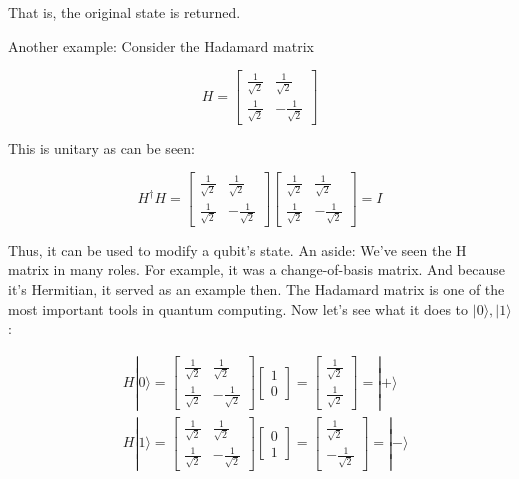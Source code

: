\documentclass[main.tex]{subfiles}
\begin{document}
    That is, the original state is returned.
    
    Another example: Consider the Hadamard matrix
    
    $$
    H=\left[\begin{array}{cc}
    \frac{1}{\sqrt{2}} & \frac{1}{\sqrt{2}} \\
    \frac{1}{\sqrt{2}} & -\frac{1}{\sqrt{2}}
    \end{array}\right]
    $$
    
    This is unitary as can be seen:
    
    $$
    H^{\dagger} H=\left[\begin{array}{cc}
    \frac{1}{\sqrt{2}} & \frac{1}{\sqrt{2}} \\
    \frac{1}{\sqrt{2}} & -\frac{1}{\sqrt{2}}
    \end{array}\right]\left[\begin{array}{cc}
    \frac{1}{\sqrt{2}} & \frac{1}{\sqrt{2}} \\
    \frac{1}{\sqrt{2}} & -\frac{1}{\sqrt{2}}
    \end{array}\right]=I
    $$
    
    Thus, it can be used to modify a qubit's state. An aside: We've seen the H matrix in many roles. For example, it was a change-of-basis matrix. And because it's Hermitian, it served as an example then. The Hadamard matrix is one of the most important tools in quantum computing. Now let's see what it does to $|0\rangle,|1\rangle$ :
    
    $$
    \begin{aligned}
    &H|0\rangle=\left[\begin{array}{cc}
    \frac{1}{\sqrt{2}} & \frac{1}{\sqrt{2}} \\
    \frac{1}{\sqrt{2}} & -\frac{1}{\sqrt{2}}
    \end{array}\right]\left[\begin{array}{l}
    1 \\
    0
    \end{array}\right]=\left[\begin{array}{c}
    \frac{1}{\sqrt{2}} \\
    \frac{1}{\sqrt{2}}
    \end{array}\right]=|+\rangle \\
    &H|1\rangle=\left[\begin{array}{cc}
    \frac{1}{\sqrt{2}} & \frac{1}{\sqrt{2}} \\
    \frac{1}{\sqrt{2}} & -\frac{1}{\sqrt{2}}
    \end{array}\right]\left[\begin{array}{l}
    0 \\
    1
    \end{array}\right]=\left[\begin{array}{r}
    \frac{1}{\sqrt{2}} \\
    -\frac{1}{\sqrt{2}}
    \end{array}\right]=|-\rangle
    \end{aligned}
    $$
    
\end{document}
